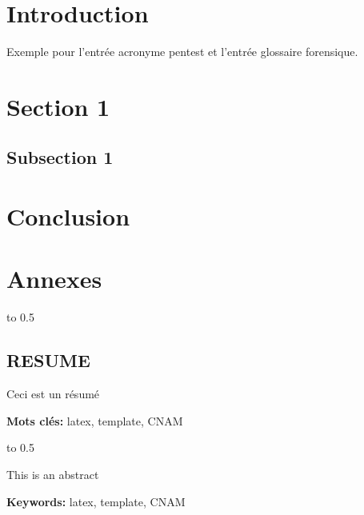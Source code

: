 \documentclass[12pt]{article}
\begin{document}
\newpage
\section*{Introduction}

Exemple pour l'entrée acronyme \gls{pentest} et l'entrée glossaire \gls{forensique}.

\newpage

\section{Section 1}
\subsection{Subsection 1}

\newpage

\section{Conclusion}

\newpage

\section*{Annexes}

\newpage




\newpage
\centerline{\hbox to 0.5\textwidth{\hrulefill}}

\begin{center}

\section*{RESUME}

\end{center}

Ceci est un résumé

\textbf{Mots clés:} latex, template, CNAM\\

\centerline{\hbox to 0.5\textwidth{\hrulefill}}

\begin{center}


\end{center}

This is an abstract

\textbf{Keywords:} latex, template, CNAM
\end{document}
